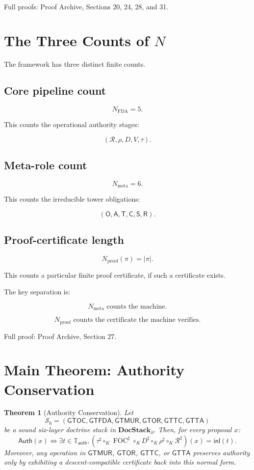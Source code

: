\documentclass[11pt]{article}
\newtheorem{theorem}{Theorem}[section]
\begin{document}
Full proofs: Proof Archive, Sections 20, 24, 28, and 31.

\section{The Three Counts of \texorpdfstring{\(N\)}{N}}

The framework has three distinct finite counts.

\subsection{Core pipeline count}

\[
\boxed{
N_{\mathrm{FDA}}=5.
}
\]

This counts the operational authority stages:

\[
(\mathcal R,\rho,D,V,\tau).
\]

\subsection{Meta-role count}

\[
\boxed{
N_{\mathrm{meta}}=6.
}
\]

This counts the irreducible tower obligations:

\[
(\mathsf O,\mathsf A,\mathsf T,\mathsf C,\mathsf S,\mathsf R).
\]

\subsection{Proof-certificate length}

\[
\boxed{
N_{\mathrm{proof}}(\pi)=|\pi|.
}
\]

This counts a particular finite proof certificate, if such a certificate exists.

The key separation is:

\[
\boxed{
N_{\mathrm{meta}}\text{ counts the machine.}
}
\]

\[
\boxed{
N_{\mathrm{proof}}\text{ counts the certificate the machine verifies.}
}
\]

Full proof: Proof Archive, Section 27.

\section{Main Theorem: Authority Conservation}

\begin{theorem}[Authority Conservation] \label{thm:auth_cons}
Let
\[
\mathcal S_6
=
(
\mathsf{GTOC},
\mathsf{GTFDA},
\mathsf{GTMUR},
\mathsf{GTOR},
\mathsf{GTTC},
\mathsf{GTTA}
)
\]
be a sound six-layer doctrine stack in \(\mathbf{DocStack}_{\partial}\). Then, for every proposal \(x\):
\[
\boxed{
\mathsf{Auth}(x)
\iff
\exists t\in\mathbb T_{\mathsf{auth}},
(\tau^\sharp\circ_K \operatorname{FOC}^\sharp\circ_K D^\sharp\circ_K \rho^\sharp\circ_K \mathcal R^\sharp)(x)=\mathsf{inl}(t).
}
\]
Moreover, any operation in \(\mathsf{GTMUR}\), \(\mathsf{GTOR}\), \(\mathsf{GTTC}\), or \(\mathsf{GTTA}\) preserves authority only by exhibiting a descent-compatible certificate back into this normal form.
\end{theorem}
\end{document}
